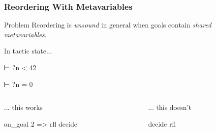 \begin{frame}[fragile]
  \frametitle{Reordering With Metavariables}

  \begin{block}{Problem}
    Reordering is \emph{unsound} in general when goals contain \emph{shared metavariables}.
  \end{block}

  \pause

  \begin{block}{In tactic state...}
    \begin{leancode}
      ⊢ ?n < 42

      ⊢ ?n = 0
    \end{leancode}
  \end{block}

  \pause

  \begin{columns}[onlytextwidth]
    \begin{column}{.45\textwidth}
      \begin{block}{... this works}
        \begin{leancode}
          on_goal 2 => rfl
          decide
        \end{leancode}
      \end{block}
    \end{column}
    \pause
    \begin{column}{.45\textwidth}
      \begin{block}{... this doesn't}
        \begin{leancode}
          decide
          rfl
        \end{leancode}
      \end{block}
    \end{column}
  \end{columns}
\end{frame}

